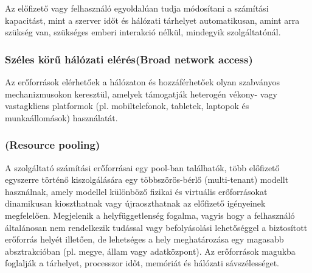 Az előfizető vagy felhasználó egyoldalúan tudja módosítani a számítási kapacitást, mint a szerver időt  és hálózati tárhelyet automatikusan, amint arra szükség van, szükséges emberi interakció nélkül, mindegyik szolgáltatónál.

\subsubsection{Széles körű hálózati elérés(\foreignlanguage{english}{Broad network access})}

Az erőforrások elérhetőek a hálózaton és hozzáférhetőek olyan szabványos mechanizmusokon keresztül, amelyek támogatják heterogén vékony- vagy vastagkliens platformok (pl. mobiltelefonok, tabletek, laptopok és munkaállomások) használatát.

\subsubsection{(\foreignlanguage{english}{Resource pooling})}

A szolgáltató számítási erőforrásai egy pool-ban  találhatók, több előfizető egyszerre történő kiszolgálására egy többszörös-bérlő (multi-tenant) modellt használnak, amely modellel különböző fizikai és virtuális erőforrásokat dinamikusan kioszthatnak vagy újraoszthatnak az előfizető igényeinek megfelelően. Megjelenik a helyfüggetlenség fogalma, vagyis hogy a felhasználó általánosan nem rendelkezik tudással vagy befolyásolási lehetőséggel a biztosított erőforrás helyét illetően, de lehetséges a hely meghatározása egy magasabb absztrakcióban (pl. megye, állam vagy adatközpont). Az erőforrások magukba foglalják a tárhelyet, processzor időt, memóriát és hálózati sávszélességet.

